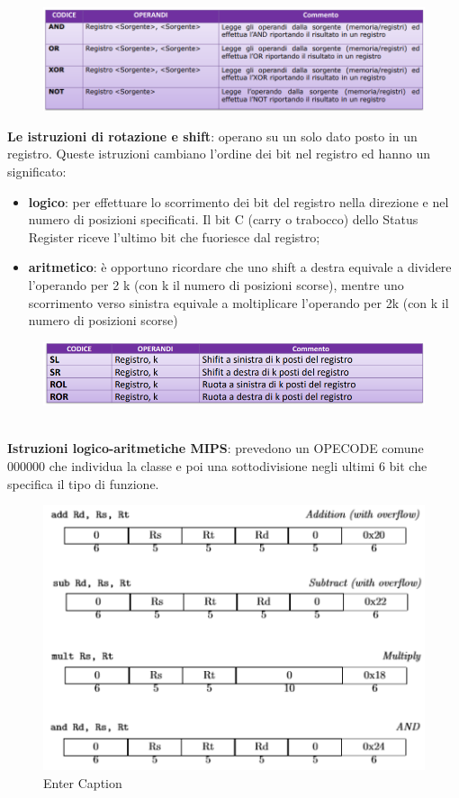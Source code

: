 \documentclass[12pt]{article} %
\begin{document}
\begin{figure}[h]
    \centering
    \includegraphics[width=1\linewidth]{operazioni logiche.png}
\end{figure}
\newpage
\noindent \textbf{Le istruzioni di rotazione e shift}: operano su un solo dato posto in un registro. Queste istruzioni cambiano l’ordine dei bit nel registro ed hanno un significato: 
\begin{itemize}
    \item \textbf{logico}: per effettuare lo scorrimento dei bit del registro nella direzione e nel numero di posizioni specificati. Il bit C (carry o trabocco) dello Status Register riceve l’ultimo bit che fuoriesce dal registro; 
    \item \textbf{aritmetico}: è opportuno ricordare che uno shift a destra equivale a dividere l’operando per 2 k (con k il numero di posizioni scorse), mentre uno scorrimento verso sinistra equivale a moltiplicare l’operando per 2k (con k il numero di posizioni scorse)
\end{itemize}
\begin{figure}[h]
    \centering
    \includegraphics[width=1\linewidth]{shitf e rotazione.png}
\end{figure} 
\par\maketitle\noindent \\ 
\textbf{Istruzioni logico-aritmetiche MIPS}: prevedono un OPECODE comune 000000 che individua la classe e poi una sottodivisione negli ultimi 6 bit che specifica il tipo di funzione.
\begin{figure}[h]
    \centering
    \includegraphics[width=0.75\linewidth]{opecode.png}
    \caption{Enter Caption}
    \label{fig:enter-label}
\end{figure}
\end{document}
